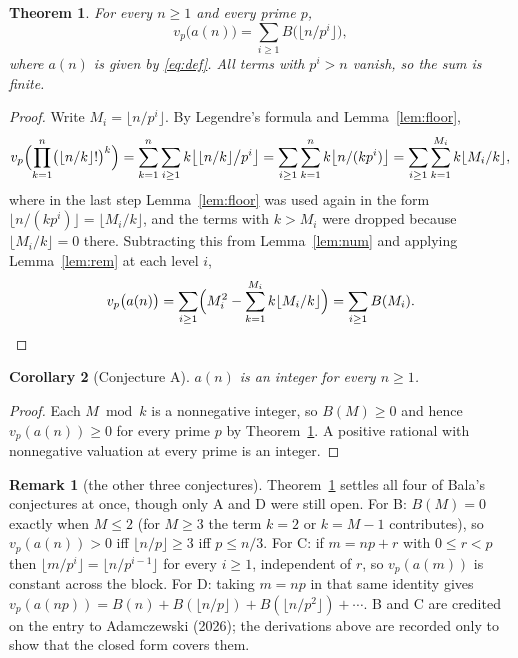 \documentclass[11pt,a4paper]{article}
\theoremstyle{plain}
\newtheorem{theorem}{Theorem}
\newtheorem{corollary}[theorem]{Corollary}
\theoremstyle{definition}
\newtheorem*{remark}{Remark}
\begin{document}
\begin{theorem}\label{thm:main}
For every $n\ge1$ and every prime $p$,
\[
  v_{p}\bigl(a(n)\bigr)=\sum_{i\ge1}B\bigl(\lfloor n/p^{i}\rfloor\bigr),
\]
where $a(n)$ is given by \eqref{eq:def}. All terms with $p^{i}>n$ vanish, so the sum is
finite.
\end{theorem}

\begin{proof}
Write $M_{i}=\lfloor n/p^{i}\rfloor$. By Legendre's formula and Lemma~\ref{lem:floor},
\[
  v_{p}\Bigl(\prod_{k=1}^{n}\bigl(\lfloor n/k\rfloor!\bigr)^{k}\Bigr)
  =\sum_{k=1}^{n}\sum_{i\ge1}k\bigl\lfloor\lfloor n/k\rfloor\big/p^{i}\bigr\rfloor
  =\sum_{i\ge1}\sum_{k=1}^{n}k\bigl\lfloor n/(kp^{i})\bigr\rfloor
  =\sum_{i\ge1}\sum_{k=1}^{M_{i}}k\lfloor M_{i}/k\rfloor,
\]
where in the last step Lemma~\ref{lem:floor} was used again in the form
$\lfloor n/(kp^{i})\rfloor=\lfloor M_{i}/k\rfloor$, and the terms with $k>M_{i}$ were
dropped because $\lfloor M_{i}/k\rfloor=0$ there. Subtracting this from Lemma~\ref{lem:num}
and applying Lemma~\ref{lem:rem} at each level $i$,
\[
  v_{p}\bigl(a(n)\bigr)=\sum_{i\ge1}\Bigl(M_{i}^{2}-\sum_{k=1}^{M_{i}}k\lfloor M_{i}/k
  \rfloor\Bigr)=\sum_{i\ge1}B(M_{i}).\qedhere
\]
\end{proof}

\begin{corollary}[Conjecture A]\label{cor:A}
$a(n)$ is an integer for every $n\ge1$.
\end{corollary}

\begin{proof}
Each $M\bmod k$ is a nonnegative integer, so $B(M)\ge0$ and hence $v_{p}(a(n))\ge0$ for
every prime $p$ by Theorem~\ref{thm:main}. A positive rational with nonnegative valuation
at every prime is an integer.
\end{proof}

\begin{remark}[the other three conjectures]
Theorem~\ref{thm:main} settles all four of Bala's conjectures at once, though only A and D
were still open. For B: $B(M)=0$ exactly when $M\le2$ (for $M\ge3$ the term $k=2$ or
$k=M-1$ contributes), so $v_{p}(a(n))>0$ iff $\lfloor n/p\rfloor\ge3$ iff $p\le n/3$. For
C: if $m=np+r$ with $0\le r<p$ then $\lfloor m/p^{i}\rfloor=\lfloor n/p^{i-1}\rfloor$ for
every $i\ge1$, independent of $r$, so $v_{p}(a(m))$ is constant across the block. For D:
taking $m=np$ in that same identity gives
$v_{p}(a(np))=B(n)+B(\lfloor n/p\rfloor)+B(\lfloor n/p^{2}\rfloor)+\cdots$. B and C are
credited on the entry to Adamczewski (2026); the derivations above are recorded only to
show that the closed form covers them.
\end{remark}
\end{document}
